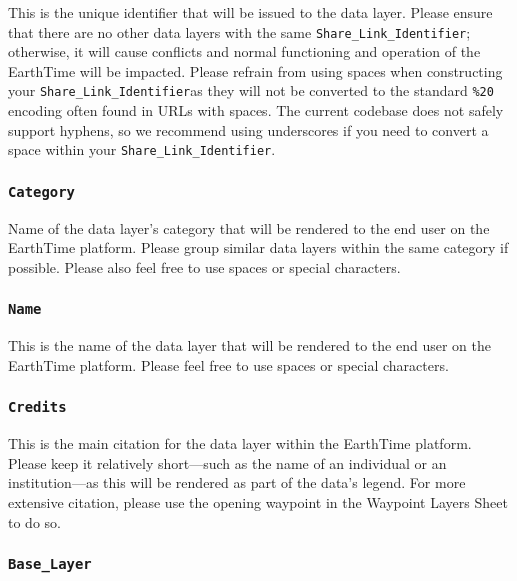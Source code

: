 \documentclass[
  12pt,
]{krantz}
\begin{document}
This is the unique identifier that will be issued to the data layer. Please ensure that there are no other data layers with the same \texttt{Share\_Link\_Identifier}; otherwise, it will cause conflicts and normal functioning and operation of the EarthTime will be impacted. Please refrain from using spaces when constructing your \texttt{Share\_Link\_Identifier}as they will not be converted to the standard \texttt{\%20} encoding often found in URLs with spaces. The current codebase does not safely support hyphens, so we recommend using underscores if you need to convert a space within your \texttt{Share\_Link\_Identifier}.

\hypertarget{category}{%
\subsubsection*{\texorpdfstring{\texttt{Category}}{Category}}\label{category}}


Name of the data layer's category that will be rendered to the end user on the EarthTime platform. Please group similar data layers within the same category if possible. Please also feel free to use spaces or special characters.

\hypertarget{name}{%
\subsubsection*{\texorpdfstring{\texttt{Name}}{Name}}\label{name}}


This is the name of the data layer that will be rendered to the end user on the EarthTime platform. Please feel free to use spaces or special characters.

\hypertarget{credits}{%
\subsubsection*{\texorpdfstring{\texttt{Credits}}{Credits}}\label{credits}}


This is the main citation for the data layer within the EarthTime platform. Please keep it relatively short---such as the name of an individual or an institution---as this will be rendered as part of the data's legend. For more extensive citation, please use the opening waypoint in the Waypoint Layers Sheet to do so.

\hypertarget{base_layer}{%
\subsubsection*{\texorpdfstring{\texttt{Base\_Layer}}{Base\_Layer}}\label{base_layer}}
\end{document}
